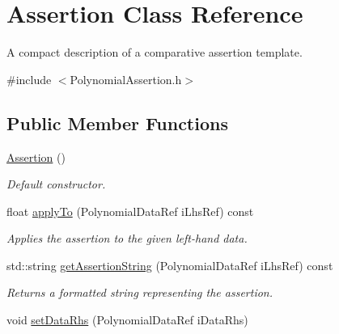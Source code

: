 \hypertarget{class_assertion}{\section{Assertion Class Reference}
\label{class_assertion}
}


A compact description of a comparative assertion template.  




{\ttfamily \#include $<$Polynomial\-Assertion.\-h$>$}

\subsection*{Public Member Functions}
\begin{DoxyCompactItemize}
\item 
\hypertarget{class_assertion_a97bcb911418eb279c6ccc6236208a06a}{\hyperlink{class_assertion_a97bcb911418eb279c6ccc6236208a06a}{Assertion} ()}\label{class_assertion_a97bcb911418eb279c6ccc6236208a06a}

\begin{DoxyCompactList}\small\item\em Default constructor. \end{DoxyCompactList}\item 
\hypertarget{class_assertion_a3acb3e23e1c425d1a017edf3186b31fa}{float \hyperlink{class_assertion_a3acb3e23e1c425d1a017edf3186b31fa}{apply\-To} (Polynomial\-Data\-Ref i\-Lhs\-Ref) const }\label{class_assertion_a3acb3e23e1c425d1a017edf3186b31fa}

\begin{DoxyCompactList}\small\item\em Applies the assertion to the given left-\/hand data. \end{DoxyCompactList}\item 
\hypertarget{class_assertion_a8181e04370c4581826e2d93973373def}{std\-::string \hyperlink{class_assertion_a8181e04370c4581826e2d93973373def}{get\-Assertion\-String} (Polynomial\-Data\-Ref i\-Lhs\-Ref) const }\label{class_assertion_a8181e04370c4581826e2d93973373def}

\begin{DoxyCompactList}\small\item\em Returns a formatted string representing the assertion. \end{DoxyCompactList}\item 
\hypertarget{class_assertion_a32800847872df8197d7d640584c19592}{void \hyperlink{class_assertion_a32800847872df8197d7d640584c19592}{set\-Data\-Rhs} (Polynomial\-Data\-Ref i\-Data\-Rhs)}\label{class_assertion_a32800847872df8197d7d640584c19592}


\end{DoxyCompactItemize}
